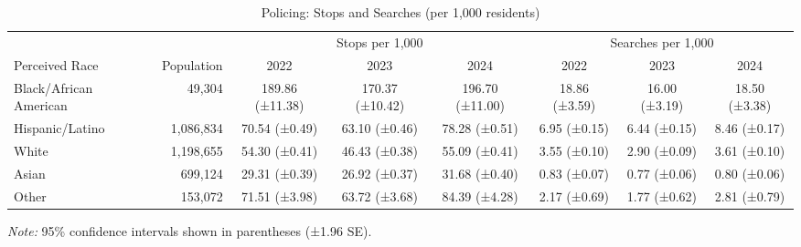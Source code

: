 
\begin{table}[H]
\centering
\caption{Policing: Stops and Searches (per 1,000 residents)}
\label{tab:stops_searches}
\begin{tabular}{l r ccc ccc}
\toprule
 & & \multicolumn{3}{c}{Stops per 1,000} & \multicolumn{3}{c}{Searches per 1,000} \\
\cmidrule(lr){3-5} \cmidrule(lr){6-8}
Perceived Race & Population & 2022 & 2023 & 2024 & 2022 & 2023 & 2024 \\
\midrule
Black/African American & 49,304 & 189.86 ({\scriptsize ±11.38}) & 170.37 ({\scriptsize ±10.42}) & 196.70 ({\scriptsize ±11.00}) & 18.86 ({\scriptsize ±3.59}) & 16.00 ({\scriptsize ±3.19}) & 18.50 ({\scriptsize ±3.38}) \\
Hispanic/Latino & 1,086,834 & 70.54 ({\scriptsize ±0.49}) & 63.10 ({\scriptsize ±0.46}) & 78.28 ({\scriptsize ±0.51}) & 6.95 ({\scriptsize ±0.15}) & 6.44 ({\scriptsize ±0.15}) & 8.46 ({\scriptsize ±0.17}) \\
White & 1,198,655 & 54.30 ({\scriptsize ±0.41}) & 46.43 ({\scriptsize ±0.38}) & 55.09 ({\scriptsize ±0.41}) & 3.55 ({\scriptsize ±0.10}) & 2.90 ({\scriptsize ±0.09}) & 3.61 ({\scriptsize ±0.10}) \\
Asian & 699,124 & 29.31 ({\scriptsize ±0.39}) & 26.92 ({\scriptsize ±0.37}) & 31.68 ({\scriptsize ±0.40}) & 0.83 ({\scriptsize ±0.07}) & 0.77 ({\scriptsize ±0.06}) & 0.80 ({\scriptsize ±0.06}) \\
Other & 153,072 & 71.51 ({\scriptsize ±3.98}) & 63.72 ({\scriptsize ±3.68}) & 84.39 ({\scriptsize ±4.28}) & 2.17 ({\scriptsize ±0.69}) & 1.77 ({\scriptsize ±0.62}) & 2.81 ({\scriptsize ±0.79}) \\
\bottomrule
\end{tabular}
\smallskip
\parbox{\textwidth}{\footnotesize \textit{Note:} 95\% confidence intervals shown in parentheses (±1.96 SE).}
\end{table}

